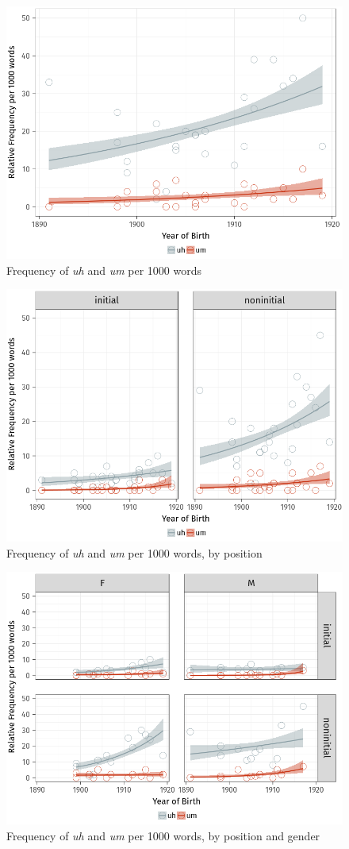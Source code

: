 \documentclass[11pt]{article}
\begin{document}
\begin{figure}[htpb]
    \centering
    \includegraphics[width=0.8\linewidth]{figures/relfreq.png}
    \caption{Frequency of \emph{uh} and \emph{um} per 1000 words}%
    \label{fig:relfreq}
\end{figure}

\begin{figure}[htpb]
    \centering
    \includegraphics[width=0.8\linewidth]{figures/relfreqposition.png}
    \caption{Frequency of \emph{uh} and \emph{um} per 1000 words, by position}%
    \label{fig:relfreqposition}
\end{figure}

\begin{figure}[htpb]
    \centering
    \includegraphics[width=0.8\linewidth]{figures/relfreqgenderposition.png}
    \caption{Frequency of \emph{uh} and \emph{um} per 1000 words, by position
    and gender}%
    \label{fig:relfreqgenderposition}
\end{figure}
\end{document}
